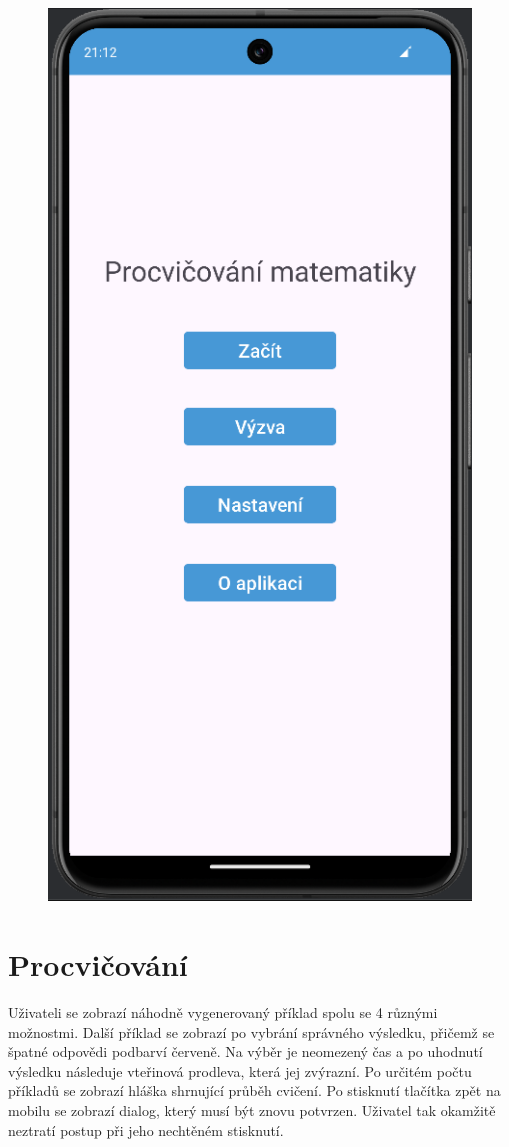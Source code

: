 \documentclass[12pt]{report}
\begin{document}
	\begin{figure}[ht]
		\centering
		\includegraphics[height=0.9\textwidth]{img/menu}
		\label{fig:menu}
	\end{figure}
	
	\newpage
	\section{Procvičování}
	Uživateli se zobrazí náhodně vygenerovaný příklad spolu se 4 různými možnostmi. Další příklad se zobrazí po vybrání správného výsledku, přičemž se špatné odpovědi podbarví červeně. Na výběr je neomezený čas a po uhodnutí výsledku následuje vteřinová prodleva, která jej zvýrazní. Po určitém počtu příkladů se zobrazí hláška shrnující průběh cvičení. Po stisknutí tlačítka zpět na mobilu se zobrazí dialog, který musí být znovu potvrzen. Uživatel tak okamžitě neztratí postup při jeho nechtěném stisknutí.
	
\end{document}
